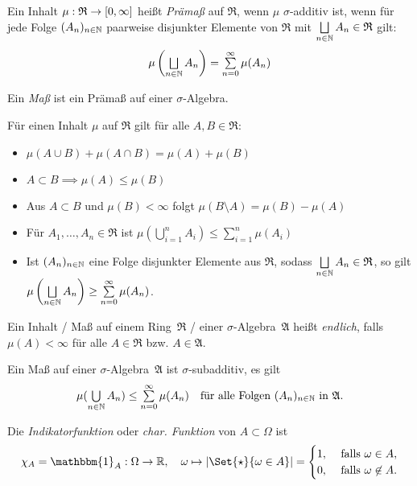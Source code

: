 \documentclass{cheat-sheet}
\newcommand{\Alg}{\mathfrak{A}} %
\newcommand{\Ring}{\mathfrak{R}} %
\newcommand{\ind}{\mathbbm{1}} %
\theoremstyle{definition}
\begin{document}
\begin{defn}
  Ein Inhalt $\mu : \Ring \to \cinterval{0}{\infty}$ heißt \emph{Prämaß} auf $\Ring$, wenn $\mu$ $\sigma$-additiv ist, \dh{} wenn für jede Folge $(A_n)_{n \in \mathbb{N}}$ paarweise disjunkter Elemente von $\Ring$ mit $\bigsqcup_{n \in \N} A_n \in \Ring$ gilt:
  \[ \mu\left(\bigsqcup_{n \in \N} A_n\right) = \sum_{n=0}^\infty \mu(A_n) \]
\end{defn}


\begin{defn}
  Ein \emph{Maß} ist ein Prämaß auf einer $\sigma$-Algebra.
\end{defn}

\begin{satz}
  Für einen Inhalt $\mu$ auf $\Ring$ gilt für alle $A, B \in \Ring$:
  \begin{itemize}
    \item $\mu(A \cup B) + \mu(A \cap B) = \mu(A) + \mu(B)$
    \item $A \subset B \implies \mu(A) \leq \mu(B)$ 
    \item Aus $A \subset B$ und $\mu(B) < \infty$ folgt $\mu(B \setminus A) = \mu(B) - \mu(A)$
    \item Für $A_1, \ldots, A_n \in \Ring$ ist $\mu\left(\bigcup_{i = 1}^n A_i \right) \leq \sum_{i = 1}^n \mu(A_i)$ 
    \item Ist $(A_n)_{n \in \mathbb{N}}$ eine Folge disjunkter Elemente aus $\Ring$, sodass $\bigsqcup_{n \in \N} A_n \in \Ring$, so gilt $\mu \left( \bigsqcup_{n \in \N} A_n \right) \geq \sum_{n=0}^\infty \mu(A_n)$.
  \end{itemize}
\end{satz}

\begin{defn}
  Ein Inhalt / Maß auf einem Ring~$\Ring$ / einer $\sigma$-Algebra~$\Alg$ heißt \emph{endlich}, falls $\mu(A) < \infty$ für alle $A \in \Ring$ bzw. $A \in \Alg$.
\end{defn}

\begin{satz}
  Ein Maß auf einer $\sigma$-Algebra~$\Alg$ ist $\sigma$-subadditiv, \dh{} es gilt
  \[ \mu(\bigcup_{n \in \N} A_n) \leq \sum_{n=0}^\infty \mu(A_n) \quad \text{für alle Folgen $(A_n)_{n \in \N}$ in $\Alg$}. \]
\end{satz}

\begin{defn}
  Die \emph{Indikatorfunktion} oder \emph{char. Funktion} von $A \subset \Omega$ ist
  \[
    \chi_A = \ind_A : \Omega \to \R, \quad
    \omega \mapsto \abs{\Set{ \star }{ \omega \in A }} =
    \begin{cases}
      1, & \text{ falls } \omega \in A, \\
      0, & \text{ falls } \omega \not\in A.
    \end{cases}
  \]
\end{defn}
\end{document}
